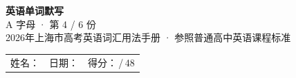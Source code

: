 \documentclass[10pt,a4paper]{article}
\begin{document}
\pagestyle{plain}

\begin{center}
{\LARGE\bfseries 英语单词默写}\\[0.22em]
{\large A 字母 · 第 4 / 6 份}\\[0.18em]
{\small 2026年上海市高考英语词汇用法手册 · 参照普通高中英语课程标准}
\end{center}

\vspace{0.25em}
\noindent\begin{tabular}{@{}p{}@{}p{}@{}p{}@{}}
姓名：\underline{\hspace{2.0cm}} & 日期：\underline{\hspace{2.0cm}} & 得分：\underline{\hspace{1.3cm}}\,/\,48 \\
\end{tabular}

\vspace{0.3em}

\vspace{0.08em}
\end{document}
